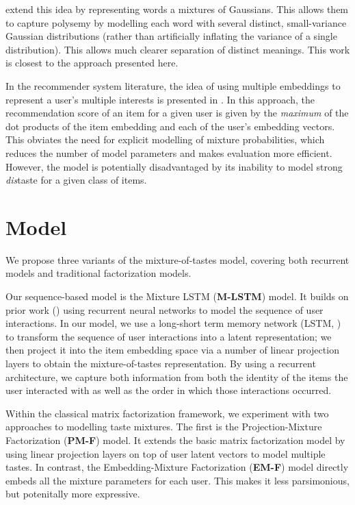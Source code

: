 \documentclass[sigchi]{acmart}
\begin{document}
\citet{athiwaratkun2017multimodal} extend this idea by representing words a mixtures of Gaussians. This allows them to capture polysemy by modelling each word with several distinct, small-variance Gaussian distributions (rather than artificially inflating the variance of a single distribution). This allows much clearer separation of distinct meanings. This work is closest to the approach presented here.

In the recommender system literature, the idea of using multiple embeddings to represent a user's multiple interests is presented in \citet{weston2013nonlinear}. In this approach, the recommendation score of an item for a given user is given by the \emph{maximum} of the dot products of the item embedding and each of the user's embedding vectors. This obviates the need for explicit modelling of mixture probabilities, which reduces the number of model parameters and makes evaluation more efficient. However, the model is potentially disadvantaged by its inability to model strong \emph{dis}taste for a given class of items.

\section{Model}
We propose three variants of the mixture-of-tastes model, covering both recurrent models and traditional factorization models.

Our sequence-based model is the Mixture LSTM (\textbf{M-LSTM}) model. It builds on prior work (\citet{wu2017recurrent, hidasi2015session}) using recurrent neural networks to model the sequence of user interactions. In our model, we use a long-short term memory network (LSTM, \cite{hochreiter1997long}) to transform the sequence of user interactions into a latent representation; we then project it into the item embedding space via a number of linear projection layers to obtain the mixture-of-tastes representation. By using a recurrent architecture, we capture both information from both the identity of the items the user interacted with as well as the order in which those interactions occurred.

Within the classical matrix factorization framework, we experiment with two approaches to modelling taste mixtures. The first is the Projection-Mixture Factorization (\textbf{PM-F}) model. It extends the basic matrix factorization model by using linear projection layers on top of user latent vectors to model multiple tastes. In contrast, the Embedding-Mixture Factorization (\textbf{EM-F}) model directly embeds all the mixture parameters for each user. This makes it less parsimonious, but potenitally more expressive.
\end{document}

